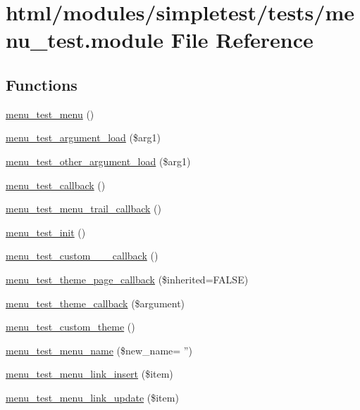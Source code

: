\hypertarget{menu__test_8module}{
\section{html/modules/simpletest/tests/menu\_\-test.module File Reference}
\label{menu__test_8module}
}
\subsection*{Functions}
\begin{DoxyCompactItemize}
\item 
\hyperlink{menu__test_8module_a47bbb5dc373947cf8998c11eeb0efa2b}{menu\_\-test\_\-menu} ()
\item 
\hyperlink{menu__test_8module_aadd0c78cb9691e6ce78789c5d177c09f}{menu\_\-test\_\-argument\_\-load} (\$arg1)
\item 
\hyperlink{menu__test_8module_ae8d4a2e171ba77f8de35bd7570855741}{menu\_\-test\_\-other\_\-argument\_\-load} (\$arg1)
\item 
\hyperlink{menu__test_8module_aadf5ae83f682b596600d8bcd014bd7ea}{menu\_\-test\_\-callback} ()
\item 
\hyperlink{menu__test_8module_a264e083b1cc00f2a5d2bfaf4395df8d5}{menu\_\-test\_\-menu\_\-trail\_\-callback} ()
\item 
\hyperlink{menu__test_8module_afd276ac2b708dea9c270dc3fd3a563a2}{menu\_\-test\_\-init} ()
\item 
\hyperlink{menu__test_8module_a5c84683c45f61be595a1cea973278709}{menu\_\-test\_\-custom\_\_\_\-callback} ()
\item 
\hyperlink{menu__test_8module_acd99960b64737e41ca0c5bad256db30f}{menu\_\-test\_\-theme\_\-page\_\-callback} (\$inherited=FALSE)
\item 
\hyperlink{menu__test_8module_af198564d0866dc9912f71d6d3ccb90a3}{menu\_\-test\_\-theme\_\-callback} (\$argument)
\item 
\hyperlink{menu__test_8module_aa75fd3dbb63b7bdcf82616dfa3aeab27}{menu\_\-test\_\-custom\_\-theme} ()
\item 
\hyperlink{menu__test_8module_abf98a6c14bcd2e2ff048374cedfa3abd}{menu\_\-test\_\-menu\_\-name} (\$new\_\-name= '')
\item 
\hyperlink{menu__test_8module_a799c5f289e6f6b334fe012ba03273c93}{menu\_\-test\_\-menu\_\-link\_\-insert} (\$item)
\item 
\hyperlink{menu__test_8module_a6caecf7a35531a40a3eb68bc89e45027}{menu\_\-test\_\-menu\_\-link\_\-update} (\$item)

\end{DoxyCompactItemize}

